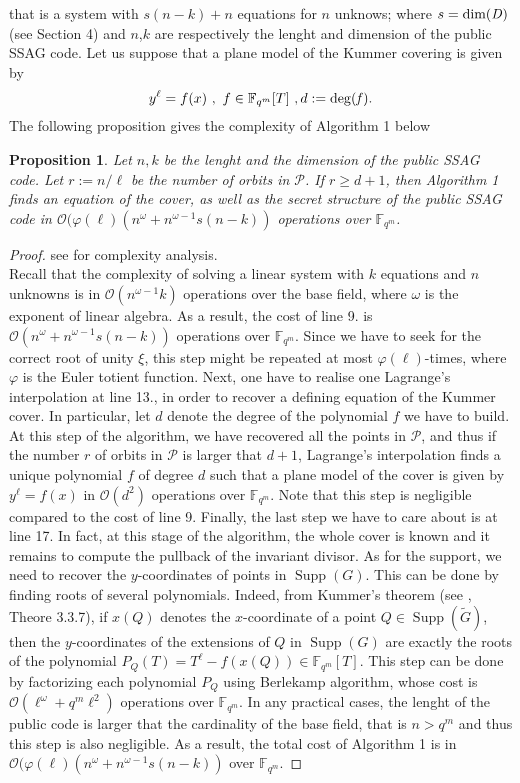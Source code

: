 \documentclass[10pt]{article}
\newtheorem{prop1}[thm]{Proposition}
\newcommand{\s}{\vspace{0.3cm}}
\newcommand{\calO}{\mathcal{O}}
\newcommand{\fqm}{\mathbb{F}_{q^m}}
\newcommand{\w}{\omega}
\newcommand{\PR}{\mathcal{P}}
\newcommand{\Supp}{\operatorname{Supp}}
\begin{document}
that is a system with $s(n-k)+n$ equations for $n$ unknows; where $s=\rm dim \it(D)$ (see Section 4) and $n$,$k$ are respectively the lenght and dimension of the public SSAG code. Let us suppose that a plane model of the Kummer covering is given by 
\[y^{\ell} = f(x) \ , \ f \in \fqm[T] \ , d:=\deg(\it f).\]
The following proposition gives the complexity of Algorithm 1 below

\s

\begin{prop1} Let $n,k$ be the lenght and the dimension of the public \rm{SSAG} \it code. Let $r := n/\ell$ be the number of orbits in $\PR$. If $r \geq d+1$, then Algorithm 1 finds an equation of the cover, as well as the secret structure of the public \rm SSAG \it code in $\calO(\varphi(\ell)(n^{\w}+n^{\w-1}s(n-k))$ operations over $\fqm$. 

\end{prop1}

\s

\begin{proof} see \cite{CF} for complexity analysis. \\
Recall that the complexity of solving a linear system with $k$ equations and $n$ unknowns is in $\calO(n^{\w-1}k)$ operations over the base field, where $\w$ is the exponent of linear algebra. As a result, the cost of line 9. is $\calO(n^{\w}+n^{\w-1}s(n-k))$ operations over $\fqm$. Since we have to seek for the correct root of unity $\xi$, this step might be repeated at most $\varphi(\ell)$-times, where $\varphi$ is the Euler totient function. Next, one have to realise one Lagrange's interpolation at line 13., in order to recover a defining equation of the Kummer cover. In particular, let $d$ denote the degree of the polynomial $f$ we have to build. At this step of the algorithm, we have recovered all the points in $\PR$, and thus if the number $r$ of orbits in $\PR$ is larger that $d+1$, Lagrange's interpolation finds a unique polynomial $f$ of degree $d$ such that a plane model of the cover is given by $y^{\ell}=f(x)$ in $\calO(d^2)$ operations over $\fqm$. Note that this step is negligible compared to the cost of line 9. Finally, the last step we have to care about is at line 17. In fact, at this stage of the algorithm, the whole cover is known and it remains to compute the pullback of the invariant divisor. As for the support, we need to recover the $y$-coordinates of points in $\Supp(G)$. This can be done by finding roots of several polynomials. Indeed, from Kummer's theorem (see \cite{Sti}, Theore 3.3.7), if $x(Q)$ denotes the $x$-coordinate of a point $Q \in \Supp(\tilde{G})$, then the $y$-coordinates of the extensions of $Q$ in $\Supp(G)$ are exactly the roots of the polynomial $P_Q(T)=T^{\ell}-f(x(Q)) \in \fqm[T]$. This step can be done by factorizing each polynomial $P_Q$ using Berlekamp algorithm, whose cost is $\calO(\ell^{\w}+q^m\ell^{2})$ operations over $\fqm$. In any practical cases, the lenght of the public code is larger that the cardinality of the base field, that is $n > q^m$ and thus this step is also negligible. As a result, the total cost of Algorithm 1 is in $\calO(\varphi(\ell)(n^{\w}+n^{\w-1}s(n-k))$ over $\fqm$.
\end{proof}
\end{document}
